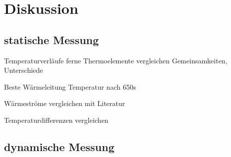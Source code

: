 \section{Diskussion}
\label{sec:Diskussion}

\subsection{statische Messung}
Temperaturverläufe ferne Thermoelemente vergleichen
Gemeinsamkeiten, Unterschiede

Beste Wärmeleitung Temperatur nach 650s

Wärmeströme vergleichen mit Literatur

Temperaturdifferenzen vergleichen 

\subsection{dynamische Messung}


